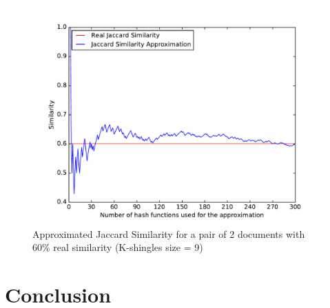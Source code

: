 \documentclass[12pt]{article}
\begin{document}
\begin{figure}[H]
	\centering
	\includegraphics[scale=0.55]{graphs/JaccardSimilarityVsApproximation.pdf}
	\caption{Approximated Jaccard Similarity for a pair of 2 documents with 60\% real similarity (K-shingles size = 9)}
	\label{fig:JaccardVsApprox}
\end{figure}

\clearpage
\section{Conclusion}

\end{document}
